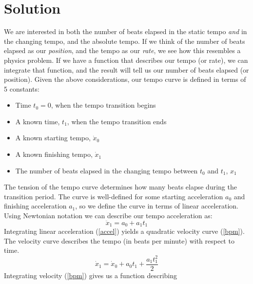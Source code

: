 \section{Solution}
\label{sec:polytempic-solution}
We are interested in both the number of beats elapsed in the static
tempo \emph{and} in the changing tempo, and the absolute tempo. If we
think of the number of beats elapsed as our \emph{position}, and the
tempo as our \emph{rate}, we see how this resembles a physics
problem. If we have a function that describes our tempo (or rate), we
can integrate that function, and the result will tell us our number of
beats elapsed (or position). Given the above considerations, our tempo
curve is defined in terms of 5 constants: \hfill\break
\begin{fullwidth}
\begin{itemize}
  \item Time $t_0=0$, when the tempo transition begins
  \item A known time, $t_1$, when the tempo transition ends
  \item A known starting tempo, $\dot{x}_0$
  \item A known finishing tempo, $\dot{x}_1$
  \item The number of beats elapsed in the changing tempo between
    $t_0$ and $t_1$, $x_1$
\end{itemize}
\end{fullwidth}
\hfill\break
The tension of the tempo curve determines how many beats elapse during
the transition period. The curve is well-defined for some starting
acceleration $a_0$ and finishing acceleration $a_1$, so we define the
curve in terms of linear acceleration. Using Newtonian notation we can
describe our tempo acceleration as:
\begin{equation}
	\label{accel}
    \ddot{x}_1 = a_0 + a_1t_1
\end{equation}
Integrating linear acceleration (\ref{accel}) yields a quadratic
velocity curve (\ref{bpm}). The velocity curve describes the tempo (in beats per
minute) with respect to
time.
\begin{equation}
	\label{bpm}
    \dot{x}_1 = \dot{x}_0 + a_0t_1 + \frac{a_1t_1^2}{2}
\end{equation}
Integrating velocity (\ref{bpm}) gives us a function describing
